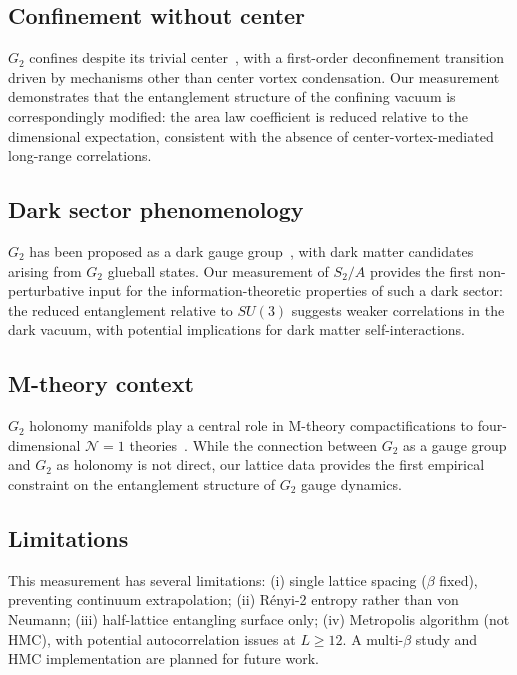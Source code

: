 \documentclass[twocolumn,prd,nofootinbib]{revtex4-2}
\begin{document}
\subsection{Confinement without center}

$G_2$ confines despite its trivial center~\cite{Holland2003}, with a first-order deconfinement transition~\cite{Cossu2007,Bruno2015} driven by mechanisms other than center vortex condensation. Our measurement demonstrates that the entanglement structure of the confining vacuum is correspondingly modified: the area law coefficient is reduced relative to the dimensional expectation, consistent with the absence of center-vortex-mediated long-range correlations.

\subsection{Dark sector phenomenology}

$G_2$ has been proposed as a dark gauge group~\cite{Masi2024}, with dark matter candidates arising from $G_2$ glueball states. Our measurement of $S_2/A$ provides the first non-perturbative input for the information-theoretic properties of such a dark sector: the reduced entanglement relative to $SU(3)$ suggests weaker correlations in the dark vacuum, with potential implications for dark matter self-interactions.

\subsection{M-theory context}

$G_2$ holonomy manifolds play a central role in M-theory compactifications to four-dimensional $\mathcal{N}=1$ theories~\cite{AtiyahWitten2001}. While the connection between $G_2$ as a gauge group and $G_2$ as holonomy is not direct, our lattice data provides the first empirical constraint on the entanglement structure of $G_2$ gauge dynamics.

\subsection{Limitations}

This measurement has several limitations: (i) single lattice spacing ($\beta$ fixed), preventing continuum extrapolation; (ii) R\'enyi-2 entropy rather than von Neumann; (iii) half-lattice entangling surface only; (iv) Metropolis algorithm (not HMC), with potential autocorrelation issues at $L \geq 12$. A multi-$\beta$ study and HMC implementation are planned for future work.
\end{document}
